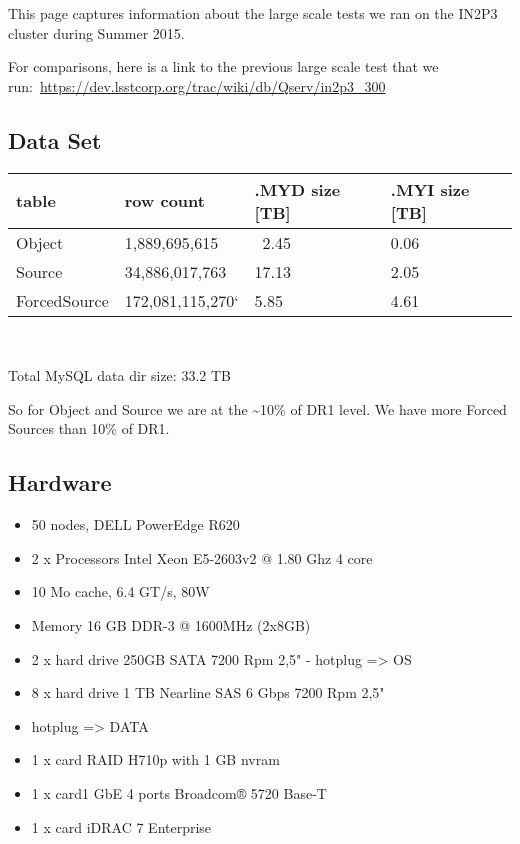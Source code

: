 This page captures information about the large scale tests we ran on the
IN2P3 cluster during Summer 2015.

For comparisons, here is a link to the previous large scale test that we
run:~\url{https://dev.lsstcorp.org/trac/wiki/db/Qserv/in2p3_300}

\subsection{Data Set}\label{data-set}

\begin{longtable}[]{@{}llll@{}}
\toprule
\textbf{table} & \textbf{row count} & \textbf{.MYD size {[}TB{]}} &
\textbf{.MYI size {[}TB{]}}\tabularnewline
\midrule
\endhead
Object & 1,889,695,615 & ~2.45 & 0.06\tabularnewline
Source & 34,886,017,763 & 17.13 & 2.05\tabularnewline
ForcedSource & 172,081,115,270` & 5.85 & 4.61\tabularnewline
\bottomrule
\end{longtable}

~

Total MySQL data dir size: 33.2 TB

So for Object and Source we are at the \textasciitilde{}10\% of DR1
level. We have more Forced Sources than 10\% of DR1.

\subsection{Hardware}\label{hardware}

\begin{itemize}
\item
  50 nodes, DELL PowerEdge R620
\item
  2 x Processors Intel Xeon E5-2603v2 @ 1.80 Ghz 4 core
\item
  10 Mo cache, 6.4 GT/s, 80W
\item
  Memory 16 GB DDR-3 @ 1600MHz (2x8GB)
\item
  2 x hard drive 250GB SATA 7200 Rpm 2,5" - hotplug =\textgreater{} OS
\item
  8 x hard drive 1 TB Nearline SAS 6 Gbps 7200 Rpm 2,5"
\item
  hotplug =\textgreater{} DATA
\item
  1 x card RAID H710p with 1 GB nvram
\item
  1 x card1 GbE 4 ports Broadcom® 5720 Base-T
\item
  1 x card iDRAC 7 Enterprise
\end{itemize}

